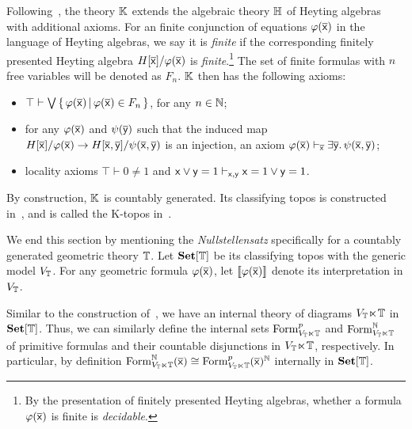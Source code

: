 \begin{example}
  Following~\citet[\S 7.3]{ghilardi2013sheaves}, the theory $\mathbb{K}$ extends the algebraic theory $\mathbb{H}$ of Heyting algebras with additional axioms. For an finite conjunction of equations $\varphi(\overline{\mathsf{x}})$ in the language of Heyting algebras, we say it is \emph{finite} if the corresponding finitely presented Heyting algebra $H[\overline{\mathsf{x}}]/\varphi(\overline{\mathsf{x}})$ is \emph{finite}.\footnote{By the presentation of finitely presented Heyting algebras, whether a formula $\varphi(\overline{\mathsf{x}})$ is finite is \emph{decidable}.} The set of finite formulas with $n$ free variables will be denoted as $F_n$. $\mathbb{K}$ then has the following axioms:
  \begin{itemize}
    \item $\top \vdash \bigvee\left\{\,\varphi(\overline{\mathsf{x}})\,\middle|\,\varphi(\overline{\mathsf{x}})\in F_n\,\right\}$, for any $n\in\mathbb{N}$;
    \item for any $\varphi(\overline{\mathsf{x}})$ and $\psi(\overline{\mathsf{y}})$ such that the induced map $H[\overline{\mathsf{x}}]/\varphi(\overline{\mathsf{x}}) \to H[\overline{\mathsf{x}},\overline{\mathsf{y}}]/\psi(\overline{\mathsf{x}},\overline{\mathsf{y}})$ is an injection, an axiom $\varphi(\overline{\mathsf{x}}) \vdash_{\overline{\mathsf{x}}} \exists\overline{\mathsf{y}}.\,\psi(\overline{\mathsf{x}},\overline{\mathsf{y}})$;
    \item locality axioms $\top \vdash 0 \neq 1$ and $\mathsf{x} \vee \mathsf{y} = 1 \vdash_{\mathsf{x},\mathsf{y}} \mathsf{x} = 1 \vee \mathsf{y} = 1$.
  \end{itemize}
  By construction, $\mathbb{K}$ is countably generated. Its classifying topos is constructed in~\citet{ghilardi2013sheaves}, and is called the K-topos in~\citet{ye2026coexact}. 
\end{example}

We end this section by mentioning the \emph{Nullstellensatz} specifically for a countably generated geometric theory $\mathbb{T}$. Let $\mathbf{Set}[\mathbb{T}]$ be its classifying topos with the generic model $V_{\mathbb{T}}$. For any geometric formula $\varphi(\overline{\mathsf{x}})$, let $\llbracket\varphi(\overline{\mathsf{x}})\rrbracket$ denote its interpretation in $V_{\mathbb{T}}$.

Similar to the construction of~, we have an internal theory of diagrams $V_{\mathbb{T}}\hspace{-.4ex}\ltimes\hspace{-.4ex}\mathbb{T}$ in $\mathbf{Set}[\mathbb{T}]$. Thus, we can similarly define the internal sets $\mathrm{Form}^p_{V_{\mathbb{T}}\ltimes\mathbb{T}}$ and $\mathrm{Form}^{\mathbb{N}}_{V_{\mathbb{T}}\ltimes\mathbb{T}}$ of primitive formulas and their countable disjunctions in $V_{\mathbb{T}}\hspace{-.4ex}\ltimes\hspace{-.4ex}\mathbb{T}$, respectively. In particular, by definition $\mathrm{Form}^{\mathbb{N}}_{V_{\mathbb{T}}\ltimes\mathbb{T}}(\overline{\mathsf{x}}) \cong \mathrm{Form}^p_{V_{\mathbb{T}} \ltimes \mathbb{T}}(\overline{\mathsf{x}})^{\mathbb{N}}$ internally in $\mathbf{Set}[\mathbb{T}]$. 

